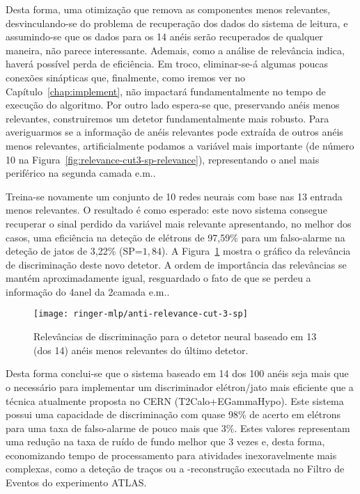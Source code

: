 Desta forma, uma otimização que remova as componentes menos relevantes,
desvinculando-se do problema de recuperação dos dados do sistema de leitura, e
assumindo-se que os dados para os 14 anéis serão recuperados de qualquer
maneira, não parece interessante. Ademais, como a análise de relevância
indica, haverá possível perda de eficiência. Em troco, eliminar-se-á algumas
poucas conexões sinápticas que, finalmente, como iremos ver no
Capítulo~\ref{chap:implement}, não impactará fundamentalmente no tempo de
execução do algoritmo. Por outro lado espera-se que, preservando anéis menos
relevantes, construiremos um detetor fundamentalmente mais robusto. Para
averiguarmos se a informação de anéis relevantes pode extraída de outros anéis
menos relevantes, artificialmente podamos a variável mais importante (de
número 10 na Figura~\ref{fig:relevance-cut3-sp-relevance}), representando o
anel mais periférico na segunda camada e.m.. 

Treina-se novamente um conjunto de 10 redes neurais com base nas 13 entrada
menos relevantes. O resultado é como esperado: este novo sistema consegue
recuperar o sinal perdido da variável mais relevante apresentando, no melhor
dos casos, uma eficiência na deteção de elétrons de 97,59\% para um
falso-alarme na deteção de jatos de 3,22\% (SP=$1,84$). A
Figura~\ref{fig:anti-relev-cut-3-sp} mostra o gráfico da relevância de
discriminação deste novo detetor. A ordem de importância das relevâncias se
mantém aproximadamente igual, resguardado o fato de que se perdeu a informação
do 4\eiro anel da 2\eira camada e.m..

\begin{figure}
\begin{center}
\texttt{[image: ringer-mlp/anti-relevance-cut-3-sp]}
\end{center}
\caption{Relevâncias de discriminação para o detetor neural baseado em 13 (dos
14) anéis menos relevantes do último detetor.}
\label{fig:anti-relev-cut-3-sp}
\end{figure}

Desta forma conclui-se que o sistema baseado em 14 dos 100 anéis seja mais que
o necessário para implementar um discriminador elétron/jato mais eficiente que
a técnica atualmente proposta no CERN (T2Calo+EGammaHypo). Este sistema possui
uma capacidade de discriminação com quase 98\% de acerto em elétrons para uma
taxa de falso-alarme de pouco mais que 3\%. Estes valores representam uma
redução na taxa de ruído de fundo melhor que 3 vezes e, desta forma,
economizando tempo de processamento para atividades inexoravelmente mais
complexas, como a deteção de traços ou a -reconstrução executada no
Filtro de Eventos do experimento ATLAS.

